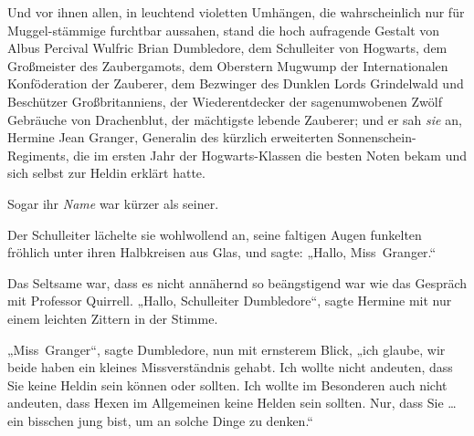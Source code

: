 Und vor ihnen allen, in leuchtend violetten Umhängen, die wahrscheinlich nur für Muggel-stämmige furchtbar aussahen, stand die hoch aufragende Gestalt von Albus Percival Wulfric Brian Dumbledore, dem Schulleiter von Hogwarts, dem Großmeister des Zaubergamots, dem Oberstern Mugwump der Internationalen Konföderation der Zauberer, dem Bezwinger des Dunklen Lords Grindelwald und Beschützer Großbritanniens, der Wiederentdecker der sagenumwobenen Zwölf Gebräuche von Drachenblut, der mächtigste lebende Zauberer; und er sah \emph{sie} an, Hermine Jean Granger, Generalin des kürzlich erweiterten Sonnenschein-Regiments, die im ersten Jahr der Hogwarts-Klassen die besten Noten bekam und sich selbst zur Heldin erklärt hatte.

Sogar ihr \emph{Name} war kürzer als seiner.

Der Schulleiter lächelte sie wohlwollend an, seine faltigen Augen funkelten fröhlich unter ihren Halbkreisen aus Glas, und sagte:
„Hallo, Miss~Granger.“

Das Seltsame war, dass es nicht annähernd so beängstigend war wie das Gespräch mit Professor Quirrell.
„Hallo, Schulleiter Dumbledore“, sagte Hermine mit nur einem leichten Zittern in der Stimme.

„Miss~Granger“, sagte Dumbledore, nun mit ernsterem Blick, „ich glaube, wir beide haben ein kleines Missverständnis gehabt. Ich wollte nicht andeuten, dass Sie keine Heldin sein können oder sollten. Ich wollte im Besonderen auch nicht andeuten, dass Hexen im Allgemeinen keine Helden sein sollten. Nur, dass Sie … ein bisschen jung bist, um an solche Dinge zu denken.“

